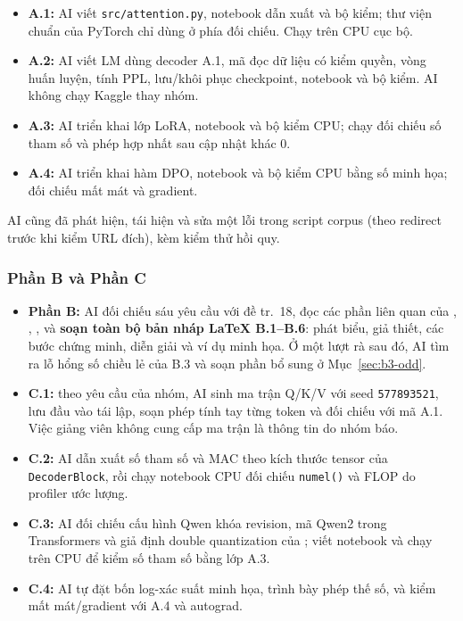 \begin{itemize}[leftmargin=2em]
\item \textbf{A.1:} AI viết \texttt{src/attention.py}, notebook dẫn xuất và bộ
kiểm; thư viện chuẩn của PyTorch chỉ dùng ở phía đối chiếu. Chạy trên CPU cục bộ.
\item \textbf{A.2:} AI viết LM dùng decoder A.1, mã đọc dữ liệu có kiểm quyền, vòng
huấn luyện, tính PPL, lưu/khôi phục checkpoint, notebook và bộ kiểm. AI không chạy
Kaggle thay nhóm.
\item \textbf{A.3:} AI triển khai lớp LoRA, notebook và bộ kiểm CPU; chạy đối chiếu
số tham số và phép hợp nhất sau cập nhật khác $0$.
\item \textbf{A.4:} AI triển khai hàm DPO, notebook và bộ kiểm CPU bằng số minh
họa; đối chiếu mất mát và gradient.
\end{itemize}

AI cũng đã phát hiện, tái hiện và sửa một lỗi trong script corpus (theo redirect
trước khi kiểm URL đích), kèm kiểm thử hồi quy.

\subsubsection{Phần B và Phần C}

\begin{itemize}[leftmargin=2em]
\item \textbf{Phần B:} AI đối chiếu sáu yêu cầu với đề tr.~18, đọc các phần liên
quan của \cite{attention}, \cite{lora}, \cite{dpo}, và \textbf{soạn toàn bộ bản
nháp LaTeX B.1--B.6}: phát biểu, giả thiết, các bước chứng minh, diễn giải và ví dụ
minh họa. Ở một lượt rà sau đó, AI tìm ra lỗ hổng số chiều lẻ của B.3 và soạn phần
bổ sung ở Mục~\ref{sec:b3-odd}.
\item \textbf{C.1:} theo yêu cầu của nhóm, AI sinh ma trận Q/K/V với seed
\texttt{577893521}, lưu đầu vào tái lập, soạn phép tính tay từng token và đối chiếu
với mã A.1. Việc giảng viên không cung cấp ma trận là thông tin do nhóm báo.
\item \textbf{C.2:} AI dẫn xuất số tham số và MAC theo kích thước tensor của
\texttt{DecoderBlock}, rồi chạy notebook CPU đối chiếu \texttt{numel()} và FLOP do
profiler ước lượng.
\item \textbf{C.3:} AI đối chiếu cấu hình Qwen khóa revision, mã Qwen2 trong
Transformers và giả định double quantization của \cite{qlora}; viết notebook và
chạy trên CPU để kiểm số tham số bằng lớp A.3.
\item \textbf{C.4:} AI tự đặt bốn log-xác suất minh họa, trình bày phép thế số, và
kiểm mất mát/gradient với A.4 và autograd.
\end{itemize}

